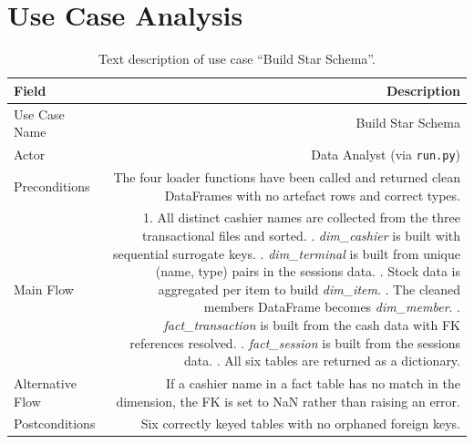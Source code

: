 \documentclass[12pt, a4paper]{report}
\begin{document}
\section{Use Case Analysis}

\begin{table}[H]
\centering
\caption{Text description of use case ``Build Star Schema''.\label{tab:uc_schema}}
\begin{tabular}{L R}
  \toprule
  \textbf{Field} & \textbf{Description} \\
  \midrule
  Use Case Name  & Build Star Schema \\
  Actor          & Data Analyst (via \texttt{run.py}) \\
  Preconditions  & The four loader functions have been called and returned clean
                   DataFrames with no artefact rows and correct types. \\
  Main Flow      & 1. All distinct cashier names are collected from the three
                      transactional files and sorted. . \textit{dim\_cashier} is built with sequential surrogate keys. . \textit{dim\_terminal} is built from unique (name, type) pairs
                      in the sessions data. . Stock data is aggregated per item to build \textit{dim\_item}. . The cleaned members DataFrame becomes \textit{dim\_member}. . \textit{fact\_transaction} is built from the cash data with
                      FK references resolved. . \textit{fact\_session} is built from the sessions data. . All six tables are returned as a dictionary. \\
  Alternative Flow & If a cashier name in a fact table has no match in the dimension,
                   the FK is set to NaN rather than raising an error. \\
  Postconditions & Six correctly keyed tables with no orphaned foreign keys. \\
  \bottomrule
\end{tabular}
\end{table}

\end{document}
